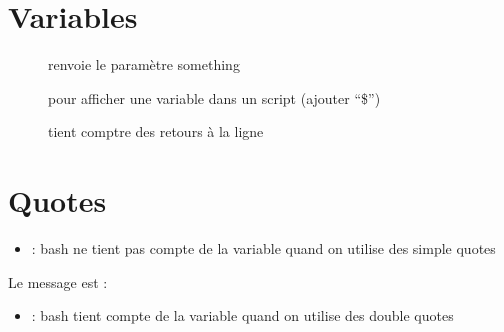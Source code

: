 \documentclass[letterpaper,10pt,french]{sphinxmanual}
\begin{document}
\section{Variables}
\label{\detokenize{21-scripts-shell:variables}}\begin{quote}

\end{quote}
\begin{description}
\item[{}] \leavevmode
renvoie le paramètre something

\item[{}] \leavevmode
pour afficher une variable dans un script (ajouter “\$”)

\item[{}] \leavevmode
tient comptre des retours à la ligne 

\end{description}


\section{Quotes}
\label{\detokenize{21-scripts-shell:quotes}}\begin{itemize}
\item {} 
 : bash ne tient pas compte de la variable quand on utilise des simple quotes 

\end{itemize}

%
\begin{sphinxVerbatim}[commandchars=\\\{\}]
\PYGZdl{} 
\PYGZdl{}  
Le message est : 
\end{sphinxVerbatim}
\begin{itemize}
\item {} 
 : bash tient compte de la variable quand on utilise des double quotes 

\end{itemize}
\end{document}

